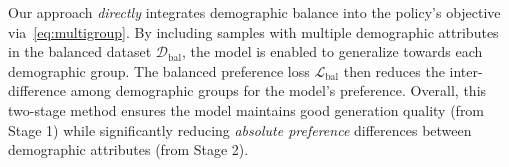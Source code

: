 Our approach \emph{directly} integrates demographic balance into the policy’s objective via~\autoref{eq:multigroup}. By including samples with multiple demographic attributes in the balanced dataset $\mathcal{D}_{\text{bal}}$, the model is enabled to generalize towards each demographic group. The balanced preference loss $\mathcal{L}_{\mathrm{bal}}$ then reduces the inter-difference among demographic groups for the model's preference. Overall, this two-stage method ensures the model maintains good generation quality (from Stage 1) while significantly reducing \emph{absolute preference} differences between demographic attributes (from Stage 2).

